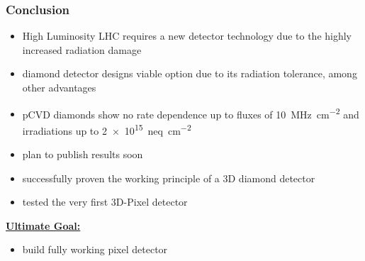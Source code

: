 \begin{frame}
	\frametitle{Conclusion}
	\begin{itemize}
		\setlength{\itemsep}{\fill}
		\item High Luminosity LHC requires a new detector technology due to the highly increased radiation damage 
		\item diamond detector designs viable option due to its radiation tolerance, among other advantages
		\item pCVD diamonds show no rate dependence up to fluxes of \SI{10}{\mega\hertz\per cm^2} and irradiations up to \SI{2e15}{neq\per cm^2}
		\item plan to publish results soon
		\item successfully proven the working principle of a 3D diamond detector
		\item tested the very first 3D-Pixel detector
	\end{itemize}
	\vspace*{5pt}
	\textbf{\underline{Ultimate Goal:}}
	\begin{itemize}
		\item build fully working pixel detector
	\end{itemize}
\end{frame}